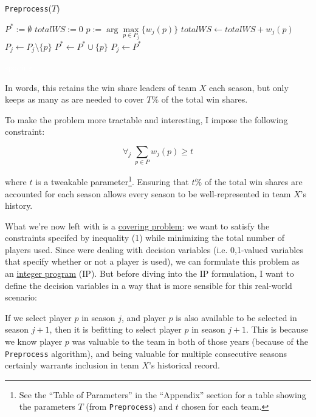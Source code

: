 \documentclass[a4paper,11pt]{article}
\begin{document}
	\begin{algorithm} [H]
	\caption{\texttt{Preprocess}($T$)}
	 {
		$P^* := \emptyset$\;
		$totalWS := 0$\;
       	 {
		$p := \arg \! \max \limits_{p \in P_j} \{w_j(p)\}$\;
		$totalWS \leftarrow totalWS + w_j(p)$\;
		$P_j \leftarrow P_j \setminus \{p\}$\;
		$P^* \leftarrow P^* \cup \{p\}$\;
	}
	$P_j \leftarrow P^*$\;
	}
	\end{algorithm}


\textcolor{white}{spacing}

In words, this retains the win share leaders of team $X$ each season, but only keeps as many as are needed to cover $T\%$ of the total win shares.

To make the problem more tractable and interesting, I impose the following constraint:

\begin{equation}
\forall_j  \; \sum_{p \in P} w_j(p) \ge t
\end{equation}

\noindent where $t$ is a tweakable parameter\footnote{See the ``Table of Parameters'' in the ``Appendix'' section for a table showing the parameters $T$ (from \texttt{Preprocess}) and $t$ chosen for each team.}. Ensuring that $t\%$ of the total win shares are accounted for each season allows every season to be well-represented in team $X$'s history.

What we're now left with is a \textcolor{blue}{\underline{\href{http://en.wikipedia.org/wiki/Covering_problems}{covering problem}}}: we want to satisfy the constraints specifed by inequality (1) while minimizing the total number of players used. Since were dealing with decision variables (i.e. 0,1-valued variables that specify whether or not a player is used), we can formulate this problem as an \textcolor{blue}{\underline{\href{http://en.wikipedia.org/wiki/Integer_programming}{integer program}}} (IP). But before diving into the IP formulation, I want to define the decision variables in a way that is more sensible for this real-world scenario:

If we select player $p$ in season $j$, and player $p$ is also available to be selected in season $j+1$, then it is befitting to select player $p$ in season $j+1$. This is because we know player $p$ was valuable to the team in both of those years (because of the \texttt{Preprocess} algorithm), and being valuable for multiple consecutive seasons certainly warrants inclusion in team $X$'s historical record.
\end{document}
